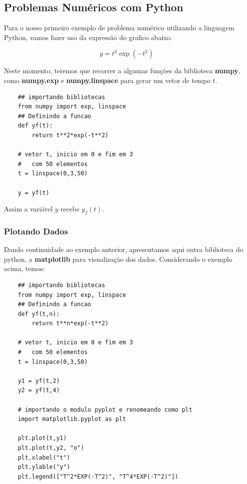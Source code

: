 \subsection{Problemas Numéricos com Python}

Para o nosso primeiro exemplo de problema numérico utilizando a linguagem Python, vamos fazer uso da expressão do grafico abaixo.

\begin{equation*}
    y = t^2\exp(-t^2)
\end{equation*}

Neste momento, teremos que recorrer a algumas funções da biblioteca \textbf{numpy}, como \textbf{numpy.exp} e \textbf{numpy.linspace} para gerar um vetor de tempo $t$.

\begin{lstlisting}
    ## importando bibliotecas
    from numpy import exp, linspace
    ## Definindo a funcao
    def yf(t):
        return t**2*exp(-t**2)

    # vetor t, inicio em 0 e fim em 3
    #   com 50 elementos
    t = linspace(0,3,50)

    y = yf(t)
\end{lstlisting}

Assim a variável $y$ recebe $y_f(t)$.

\subsubsection{Plotando Dados}

Dando continuidade ao exemplo anterior, apresentamos aqui outra biblioteca do python, a  \textbf{matplotlib} para visualização dos dados.
Considerando o exemplo acima, temos:

\begin{lstlisting}
    ## importando bibliotecas
    from numpy import exp, linspace
    ## Definindo a funcao
    def yf(t,n):
        return t**n*exp(-t**2)

    # vetor t, inicio em 0 e fim em 3
    #   com 50 elementos
    t = linspace(0,3,50)

    y1 = yf(t,2)
    y2 = yf(t,4)

    # importando o modulo pyplot e renomeando como plt
    import matplotlib.pyplot as plt

    plt.plot(t,y1)
    plt.plot(t,y2, "o")
    plt.xlabel("t")
    plt.ylable("y")
    plt.legend(["T^2*EXP(-T^2)", "T^4*EXP(-T^2)"])
\end{lstlisting}

